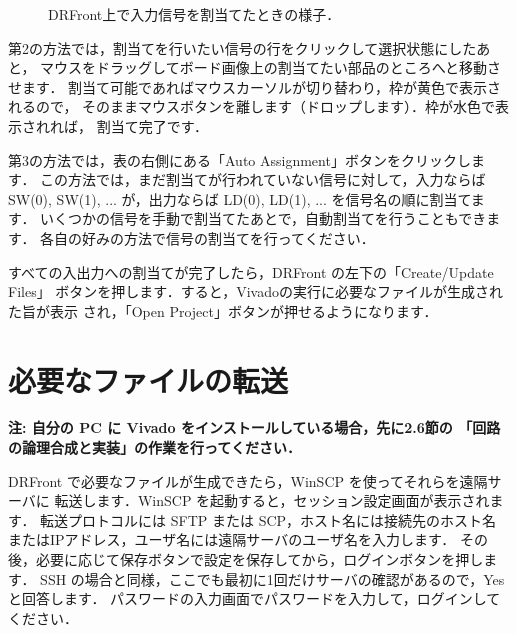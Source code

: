 \begin{figure}[ht]
 \centering
 \caption{DRFront上で入力信号を割当てたときの様子．}
 \label{fig:drfront1_2}
\end{figure}

第2の方法では，割当てを行いたい信号の行をクリックして選択状態にしたあと，
マウスをドラッグしてボード画像上の割当てたい部品のところへと移動させます．
割当て可能であればマウスカーソルが切り替わり，枠が黄色で表示されるので，
そのままマウスボタンを離します（ドロップします）．枠が水色で表示されれば，
割当て完了です．

第3の方法では，表の右側にある「Auto Assignment」ボタンをクリックします．
この方法では，まだ割当てが行われていない信号に対して，入力ならば
SW(0), SW(1), ... が，出力ならば LD(0), LD(1), ... を信号名の順に割当てます．
いくつかの信号を手動で割当てたあとで，自動割当てを行うこともできます．
各自の好みの方法で信号の割当てを行ってください．

すべての入出力への割当てが完了したら，DRFront の左下の「Create/Update Files」
ボタンを押します．すると，Vivadoの実行に必要なファイルが生成された旨が表示
され，「Open Project」ボタンが押せるようになります．

\section{必要なファイルの転送}

\textbf{注: 自分の PC に Vivado をインストールしている場合，先に2.6節の
「回路の論理合成と実装」の作業を行ってください．} \vspace*{1ex}

DRFront で必要なファイルが生成できたら，WinSCP を使ってそれらを遠隔サーバに
転送します．WinSCP を起動すると，セッション設定画面が表示されます．
転送プロトコルには SFTP または SCP，ホスト名には接続先のホスト名
またはIPアドレス，ユーザ名には遠隔サーバのユーザ名を入力します．
その後，必要に応じて保存ボタンで設定を保存してから，ログインボタンを押します．
SSH の場合と同様，ここでも最初に1回だけサーバの確認があるので，Yesと回答します．
パスワードの入力画面でパスワードを入力して，ログインしてください．

